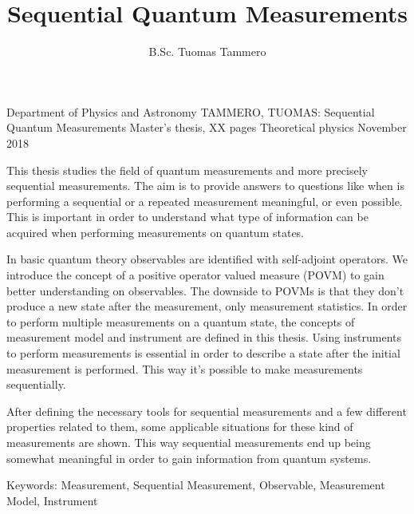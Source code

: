 \documentclass[a4paper,12pt]{wihuri}
\theoremstyle{definition}
\numberwithin{definition}{section}
\numberwithin{example}{section}
\numberwithin{theorem}{section}
\numberwithin{proposition}{section}
\numberwithin{lemma}{section}
\begin{document}
\title{Sequential Quantum Measurements}%
\author{B.Sc. Tuomas Tammero}
\maketitle




\begin{tiivistelma}%
        {Department of Physics and Astronomy}%
        {TAMMERO, TUOMAS:}%
        {Sequential Quantum Measurements}%
        {Master's thesis, XX pages}%
        {Theoretical physics}%
        {November 2018}%

This thesis studies the field of quantum measurements and more precisely sequential measurements. The aim is to provide answers to questions like when is performing a sequential or a repeated measurement meaningful, or even possible. This is important in order to understand what type of information can be acquired when performing measurements on quantum states. 

In basic quantum theory observables are identified with self-adjoint operators. We introduce the concept of a positive operator valued measure (POVM) to gain better understanding on observables. The downside to POVMs is that they don't produce a new state after the measurement, only measurement statistics. In order to perform multiple measurements on a quantum state, the concepts of measurement model and instrument are defined in this thesis. Using instruments to perform measurements is essential in order to describe a state after the initial measurement is performed. This way it's possible to make measurements sequentially.

After defining the necessary tools for sequential measurements and a few different properties related to them, some applicable situations for these kind of measurements are shown. This way sequential measurements end up being somewhat meaningful in order to gain information from quantum systems.




\noindent Keywords: Measurement, Sequential Measurement, Observable, Measurement Model, Instrument
\end{tiivistelma}
\end{document}
